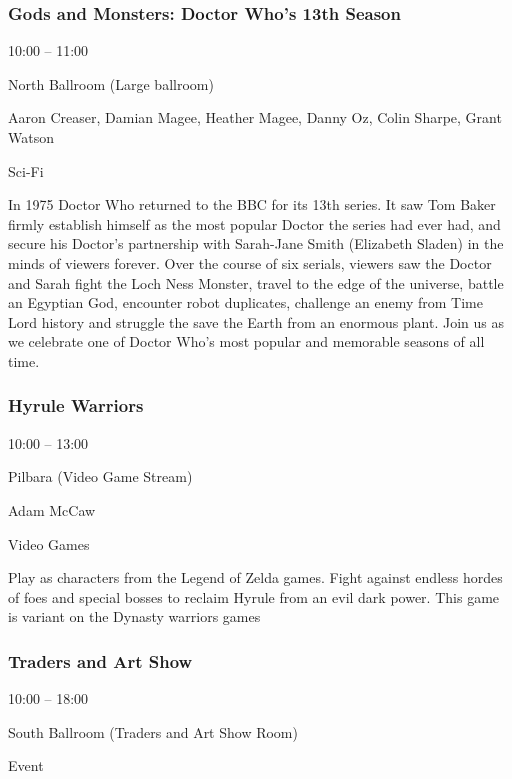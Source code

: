 \documentclass{scrreprt}
\begin{document}
\begin{multicols}{2}
\subsubsection*{Gods and Monsters: Doctor Who's 13th Season}\begin{description}
\setlength{\itemsep}{0pt}
\setlength{\parsep}{0pt}
\setlength{\parskip}{0pt}
\item[Time:]{10:00 -- 11:00}
\item[Venue:]{North Ballroom (Large ballroom)}
\item[People:]{Aaron Creaser, Damian Magee, Heather Magee, Danny Oz, Colin Sharpe, Grant Watson}
\item[Tags:]{Sci-Fi}\end{description}
In 1975 Doctor Who returned to the BBC for its 13th series. It saw Tom Baker firmly establish himself as the most popular Doctor the series had ever had, and secure his Doctor's partnership with Sarah-Jane Smith (Elizabeth Sladen) in the minds of viewers forever. Over the course of six serials, viewers saw the Doctor and Sarah fight the Loch Ness Monster, travel to the edge of the universe, battle an Egyptian God, encounter robot duplicates, challenge an enemy from Time Lord history and struggle the save the Earth from an enormous plant. Join us as we celebrate one of Doctor Who's most popular and memorable seasons of all time.
\subsubsection*{Hyrule Warriors}\begin{description}
\setlength{\itemsep}{0pt}
\setlength{\parsep}{0pt}
\setlength{\parskip}{0pt}
\item[Time:]{10:00 -- 13:00}
\item[Venue:]{Pilbara (Video Game Stream)}
\item[People:]{Adam McCaw}
\item[Tags:]{Video Games}\end{description}
Play as characters from the Legend of Zelda games. Fight against endless hordes of foes and special bosses to reclaim Hyrule from an evil dark power. This game is variant on the Dynasty warriors games
\subsubsection*{Traders and Art Show}\begin{description}
\setlength{\itemsep}{0pt}
\setlength{\parsep}{0pt}
\setlength{\parskip}{0pt}
\item[Time:]{10:00 -- 18:00}
\item[Venue:]{South Ballroom (Traders and Art Show Room)}
\item[Tags:]{Event}\end{description}


\end{multicols}
\end{document}
